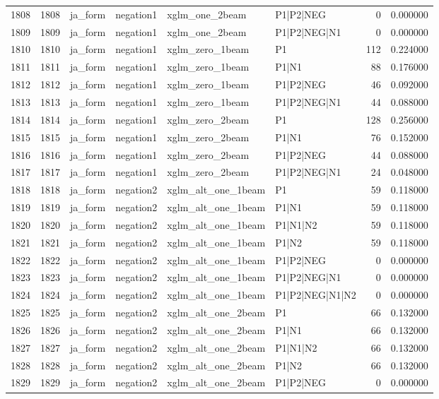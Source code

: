 \begin{tabular}{lrllllrr}
1808 & 1808 & ja_form & negation1 & xglm_one_2beam & P1|P2|NEG & 0 & 0.000000 \\
1809 & 1809 & ja_form & negation1 & xglm_one_2beam & P1|P2|NEG|N1 & 0 & 0.000000 \\
1810 & 1810 & ja_form & negation1 & xglm_zero_1beam & P1 & 112 & 0.224000 \\
1811 & 1811 & ja_form & negation1 & xglm_zero_1beam & P1|N1 & 88 & 0.176000 \\
1812 & 1812 & ja_form & negation1 & xglm_zero_1beam & P1|P2|NEG & 46 & 0.092000 \\
1813 & 1813 & ja_form & negation1 & xglm_zero_1beam & P1|P2|NEG|N1 & 44 & 0.088000 \\
1814 & 1814 & ja_form & negation1 & xglm_zero_2beam & P1 & 128 & 0.256000 \\
1815 & 1815 & ja_form & negation1 & xglm_zero_2beam & P1|N1 & 76 & 0.152000 \\
1816 & 1816 & ja_form & negation1 & xglm_zero_2beam & P1|P2|NEG & 44 & 0.088000 \\
1817 & 1817 & ja_form & negation1 & xglm_zero_2beam & P1|P2|NEG|N1 & 24 & 0.048000 \\
1818 & 1818 & ja_form & negation2 & xglm_alt_one_1beam & P1 & 59 & 0.118000 \\
1819 & 1819 & ja_form & negation2 & xglm_alt_one_1beam & P1|N1 & 59 & 0.118000 \\
1820 & 1820 & ja_form & negation2 & xglm_alt_one_1beam & P1|N1|N2 & 59 & 0.118000 \\
1821 & 1821 & ja_form & negation2 & xglm_alt_one_1beam & P1|N2 & 59 & 0.118000 \\
1822 & 1822 & ja_form & negation2 & xglm_alt_one_1beam & P1|P2|NEG & 0 & 0.000000 \\
1823 & 1823 & ja_form & negation2 & xglm_alt_one_1beam & P1|P2|NEG|N1 & 0 & 0.000000 \\
1824 & 1824 & ja_form & negation2 & xglm_alt_one_1beam & P1|P2|NEG|N1|N2 & 0 & 0.000000 \\
1825 & 1825 & ja_form & negation2 & xglm_alt_one_2beam & P1 & 66 & 0.132000 \\
1826 & 1826 & ja_form & negation2 & xglm_alt_one_2beam & P1|N1 & 66 & 0.132000 \\
1827 & 1827 & ja_form & negation2 & xglm_alt_one_2beam & P1|N1|N2 & 66 & 0.132000 \\
1828 & 1828 & ja_form & negation2 & xglm_alt_one_2beam & P1|N2 & 66 & 0.132000 \\
1829 & 1829 & ja_form & negation2 & xglm_alt_one_2beam & P1|P2|NEG & 0 & 0.000000 \\

\end{tabular}
